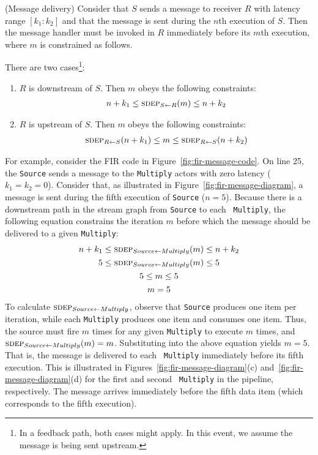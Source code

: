 \begin{definition}(Message delivery)
Consider that $S$ sends a message to receiver $R$ with latency range
$[k_1:k_2]$ and that the message is sent during the $n$th execution of
$S$.  Then the message handler must be invoked in $R$ immediately
before its $m$th execution, where $m$ is constrained as follows.

There are two cases\footnote{\small In a feedback path, both cases might apply.  In this event, we assume the message is being sent upstream.}:
\begin{enumerate}

\item $R$ is downstream of $S$.  Then $m$ obeys the following
constraints:
\[
\begin{array}{l}
n+k_1 \le \sdepf{S}{R}(m) \le n+k_2
\end{array}
\]

\item $R$ is upstream of $S$.  Then $m$ obeys the following
constraints:
\[
\begin{array}{l}
\sdepf{R}{S}(n + k_1) \le m \le \sdepf{R}{S}(n + k_2)
\end{array}
\]
\end{enumerate}
\end{definition}

For example, consider the FIR code in
Figure~\ref{fig:fir-message-code}.  On line 25, the {\tt Source} sends
a message to the {\tt Multiply} actors with zero latency ($k_1 = k_2
= 0$).  Consider that, as illustrated in
Figure~\ref{fig:fir-message-diagram}, a message is sent during the
fifth execution of {\tt Source} ($n = 5$).  Because there is a
downstream path in the stream graph from {\tt Source} to each {\tt
Multiply}, the following equation constrains the iteration $m$ before
which the message should be delivered to a given {\tt Multiply}:
\begin{equation*}
\begin{array}{c}
n+k_1 \le \sdepf{Source}{Multiply}(m) \le n + k_2 \\[0.9Ex]
5 \le \sdepf{Source}{Multiply}(m) \le 5 \\[0.9Ex]
5 \le m \le 5 \\[0.9Ex]
m = 5
\end{array}
\end{equation*}
To calculate $\sdepf{Source}{Multiply}$, observe that {\tt Source}
produces one item per iteration, while each {\tt Multiply} produces
one item and consumes one item.  Thus, the source must fire $m$ times
for any given {\tt Multiply} to execute $m$ times, and
$\sdepf{Source}{Multiply}(m) = m$.  Substituting into the above
equation yields $m=5$.  That is, the message is delivered to each {\tt
Multiply} immediately before its fifth execution.  This is illustrated
in Figures~\ref{fig:fir-message-diagram}(c)
and~\ref{fig:fir-message-diagram}(d) for the first and second {\tt
Multiply} in the pipeline, respectively.  The message arrives
immediately before the fifth data item (which corresponds to the fifth
execution).

